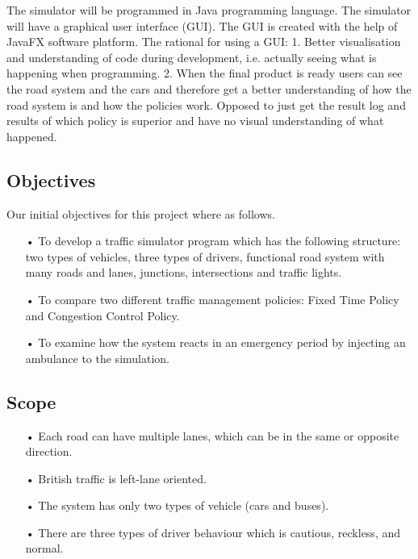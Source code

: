 \documentclass[11pt]{article}
\begin{document}
The simulator will be programmed in Java programming language. The simulator will have a graphical user interface (GUI). The GUI is created with the help of JavaFX software platform. The rational for using a GUI: 1. Better visualisation and understanding of code during development, i.e. actually seeing what is happening when programming. 2. When the final product is ready users can see the road system and the cars and therefore get a better understanding of how the road system is and how the policies work. Opposed to just get the result log and results of which policy is superior and have no visual understanding of what happened. 

\subsection{Objectives}
Our initial objectives for this project where as follows.
\begin{itemize}
\item[•] To develop a traffic simulator program which has the following structure: two types of vehicles, three types of drivers, functional road system with many roads and lanes, junctions, intersections and traffic lights.
\item[•] To compare two different traffic management policies: Fixed Time Policy and Congestion Control Policy.
\item[•]To examine how the system reacts in an emergency period by injecting an ambulance to the simulation.
\end{itemize}

\subsection{Scope}
\begin{itemize}
\item[•] Each road can have multiple lanes, which can be in the same or opposite direction.
\item[•] British traffic is left-lane oriented.
\item[•] The system has only two types of vehicle (cars and buses).
\item[•] There are three types of driver behaviour which is cautious, reckless, and normal.
\end{itemize}
	
\end{document}

